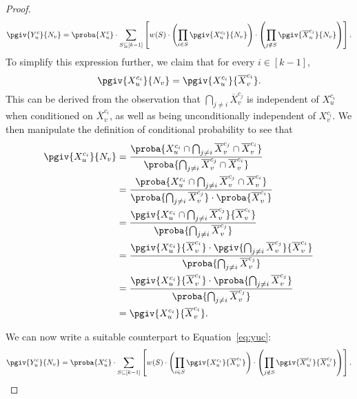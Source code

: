 \begin{proof}
	\begin{align*}
		\pgiv{Y_u^c}{N_v} = \proba{X_u^c}\cdot\sum_{S \subseteq [k - 1]} \left[ w(S)\cdot \left( \prod_{i \in S}\pgiv{X_u^{c_i}}{N_v}\right)\cdot\left(\prod_{j \notin S}\pgiv{\overline{X}_u^{c_j}}{N_v}\right) \right].
	\end{align*}
	To simplify this expression further, we claim that for every $i \in [k - 1]$,
	\[\pgiv{X_u^{c_i}}{N_v} = \pgiv{X_u^{c_i}}{\overline{X}_v^{c_i}}. \]
	This can be derived from the observation
	that $\bigcap_{j \neq i} \overline{X}_v^{c_j}$ is independent of $X_u^{c_i}$ when conditioned on $\overline{X}_v^{c_i}$, as well as being unconditionally independent of $X_v^{c_i}$.
	We then manipulate the definition of conditional probability to see that
	\begin{align*}
		\pgiv{X_u^{c_i}}{N_v} & = \frac{\proba{X_u^{c_i} \cap \bigcap_{j \neq i} \overline{X}_v^{c_j} \cap \overline{X}_v^{c_i}}}{\proba{\bigcap_{j \neq i} \overline{X}_v^{c_j} \cap \overline{X}_v^{c_i}}}        \\
		                      & = \frac{\proba{X_u^{c_i} \cap \bigcap_{j \neq i} \overline{X}_v^{c_j} \cap \overline{X}_v^{c_i}}}{\proba{\bigcap_{j \neq i} \overline{X}_v^{c_j}}\cdot\proba{\overline{X}_v^{c_i}}} \\
		                      & = \frac{\pgiv{X_u^{c_i} \cap \bigcap_{j \neq i} \overline{X}_v^{c_j}}{\overline{X}_v^{c_i}}}{\proba{\bigcap_{j \neq i} \overline{X}_v^{c_j}}}                                       \\
		                      & = \frac{\pgiv{X_u^{c_i}}{\overline{X}_v^{c_i}}\cdot\pgiv{\bigcap_{j \neq i} \overline{X}_v^{c_j}}{\overline{X}_v^{c_i}}}{\proba{\bigcap_{j \neq i} \overline{X}_v^{c_j}}}           \\
		                      & = \frac{\pgiv{X_u^{c_i}}{\overline{X}_v^{c_i}}\cdot\proba{\bigcap_{j \neq i} \overline{X}_v^{c_j}}}{\proba{\bigcap_{j \neq i} \overline{X}_v^{c_j}}}                                \\
		                      & = \pgiv{X_u^{c_i}}{\overline{X}_v^{c_i}}.
	\end{align*}

	We can now write a suitable counterpart to Equation~\eqref{eq:yuc}:
	\begin{align}\label{eq:yuc-conditional-nv}
		\pgiv{Y_u^c}{N_v} = \proba{X_u^c}\cdot\sum_{S \subseteq [k - 1]} \left[ w(S)\cdot \left( \prod_{i \in S}\pgiv{X_u^{c_i}}{\overline{X}_v^{c_i}}\right)\cdot\left(\prod_{j \notin S}\pgiv{\overline{X}_u^{c_j}}{\overline{X}_v^{c_j}}\right) \right].
	\end{align}


\end{proof}
